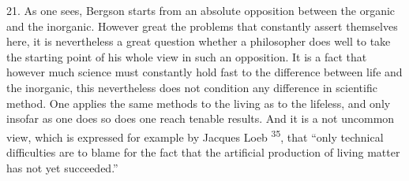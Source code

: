 \documentclass[12pt,a4paper,openany]{book}
\newcommand{\opage}[1]{\marginnote{\footnotesize\textit{[#1]}}}
\newcommand{\nm}[1]{\unskip\textsuperscript{#1}}
\begin{document}
21. As one sees, Bergson starts from an absolute opposition between the organic and the inorganic. However great the problems that constantly assert themselves here, it is nevertheless a great question whether a philosopher does well to take the starting point of his whole view in such an opposition. It is a fact that however much science must constantly
\opage{41}hold fast to the difference between life and the inorganic, this nevertheless does not condition any difference in scientific method. One applies the same methods to the living as to the lifeless, and only insofar as one does so does one reach tenable results. And it is a not uncommon view, which is expressed for example by Jacques Loeb \nm{35}, that ``only technical difficulties are to blame for the fact that the artificial production of living matter has not yet succeeded.''
\end{document}
